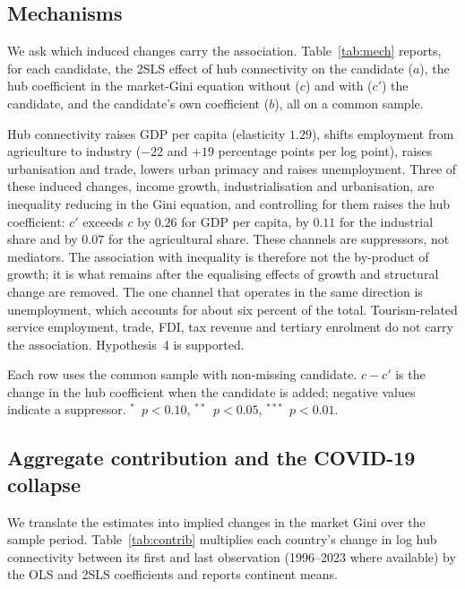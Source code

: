 \documentclass[12pt]{article}
\newcommand{\sym}[1]{\ensuremath{^{#1}}}
\begin{document}
\subsection{Mechanisms}
\label{sec:mech}
We ask which induced changes carry the association. Table~\ref{tab:mech} reports, for each candidate, the 2SLS effect of hub connectivity on the candidate ($a$), the hub coefficient in the market-Gini equation without ($c$) and with ($c'$) the candidate, and the candidate's own coefficient ($b$), all on a common sample.

Hub connectivity raises GDP per capita (elasticity $1.29$), shifts employment from agriculture to industry ($-22$ and $+19$ percentage points per log point), raises urbanisation and trade, lowers urban primacy and raises unemployment. Three of these induced changes, income growth, industrialisation and urbanisation, are inequality reducing in the Gini equation, and controlling for them raises the hub coefficient: $c'$ exceeds $c$ by $0.26$ for GDP per capita, by $0.11$ for the industrial share and by $0.07$ for the agricultural share. These channels are suppressors, not mediators. The association with inequality is therefore not the by-product of growth; it is what remains after the equalising effects of growth and structural change are removed. The one channel that operates in the same direction is unemployment, which accounts for about six percent of the total. Tourism-related service employment, trade, FDI, tax revenue and tertiary enrolment do not carry the association. Hypothesis~4 is supported.

\begin{table}[H]\centering\caption{Mechanisms: induced changes and the residual association with the market Gini (2SLS, Feyrer instrument, robust SE).}\label{tab:mech}
\begin{threeparttable}\small
\begin{tablenotes}\footnotesize\item Each row uses the common sample with non-missing candidate. $c-c'$ is the change in the hub coefficient when the candidate is added; negative values indicate a suppressor. \sym{*}~$p<0.10$, \sym{**}~$p<0.05$, \sym{***}~$p<0.01$.\end{tablenotes}\end{threeparttable}\end{table}

\subsection{Aggregate contribution and the COVID-19 collapse}
\label{sec:contrib}
We translate the estimates into implied changes in the market Gini over the sample period. Table~\ref{tab:contrib} multiplies each country's change in log hub connectivity between its first and last observation (1996--2023 where available) by the OLS and 2SLS coefficients and reports continent means.
\end{document}
